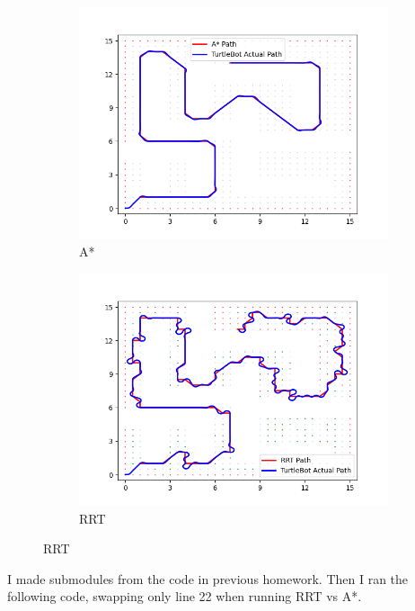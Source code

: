 \documentclass{article}
\begin{document}
\begin{figure}[H]
    \begin {subfigure} [b] {0.5\textwidth}
        \centering
        \includegraphics[width=\textwidth]{question2_astar.png}
        \caption*{A*}
    \end {subfigure}
    \begin {subfigure} [b] {0.5\textwidth}
        \centering
        \includegraphics[width=\textwidth]{question2_rrt.png}
        \caption*{RRT}
    \end {subfigure}
\end{figure}

\noindent I made submodules from the code in previous homework. Then I ran the following code, swapping only line 22 when running RRT vs A*.
\end{document}
